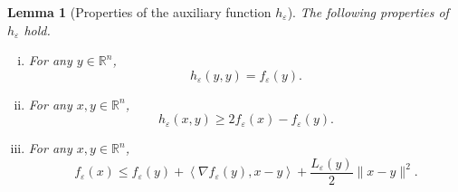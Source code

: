 \documentclass[11pt]{article}
\numberwithin{equation}{section}
\newtheorem{lemma}{Lemma}[proposition]
\begin{document}
\begin{lemma}[Properties of the auxiliary function $h_{\varepsilon}$]\label{State_h_prop}
The following properties of $h_{\varepsilon}$ hold.
\begin{enumerate}[(i)]
	\item For any $y \in \mathbb{R}^n$, \label{State_h_prop1}
	\begin{equation*}
		h_{\varepsilon}(y,y) = f_{\varepsilon}(y) .
	\end{equation*}
	\item For any $x,y \in \mathbb{R}^n$, \label{State_h_prop2}
	\begin{equation*}
		h_{\varepsilon}(x,y) \geq 2f_{\varepsilon}(x) - f_{\varepsilon}(y) .
	\end{equation*}
	\item For any $x,y \in \mathbb{R}^n$, \label{State_h_prop4}
	\begin{equation*}
		f_{\varepsilon}(x) \leq f_{\varepsilon}(y) + \left\langle \nabla f_{\varepsilon}(y), x-y \right\rangle + \frac{L_{\varepsilon}(y)}{2}\|x-y\|^2 .
	\end{equation*}
\end{enumerate}
\end{lemma}
\end{document}
